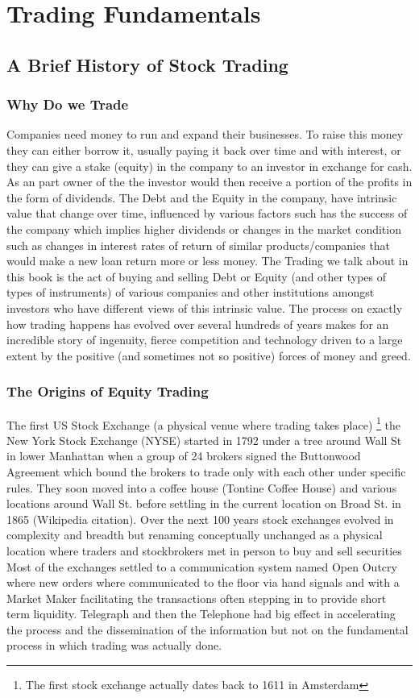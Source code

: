 
\chapter{Trading Fundamentals}

\section{A Brief History of Stock Trading}
\subsection{Why Do we Trade}
Companies need money to run and expand their businesses. To raise this money they can either borrow it, usually paying it back over time and with interest, or they can give a stake (equity) in the company to an investor in exchange for cash. As an part owner of the  the investor would then receive a portion of the profits in the form of dividends. The Debt and the Equity in the company,  have intrinsic value that change over time, influenced by various factors such has the success of the company which implies higher dividends or changes in the market condition such as changes in interest rates of return of similar products/companies that would make a new loan return more or less money. The Trading we talk about in this book is the act of buying and selling  Debt or Equity (and other types of types of instruments) of various companies and other institutions amongst investors who have different views of this intrinsic value. The process on exactly how trading happens has evolved over several hundreds of years makes for an incredible story of ingenuity, fierce competition and technology driven to a large extent by the positive (and sometimes not so positive) forces of money and greed.

\subsection{The Origins of Equity Trading}
The first US Stock Exchange (a physical venue where trading takes place) \footnote{The first stock exchange actually dates back to 1611 in Amsterdam} the New York Stock Exchange (NYSE) started in 1792 under a tree around Wall St in lower Manhattan when a group of 24 brokers signed the Buttonwood Agreement which bound the brokers to trade only with each other under specific rules. They soon moved into a coffee house (Tontine Coffee House) and various locations around Wall St. before settling in the current location on Broad St. in 1865 (Wikipedia citation). Over the next 100 years stock exchanges evolved in complexity and breadth but renaming conceptually unchanged as a physical location where traders and stockbrokers met in person to buy and sell securities Most of the exchanges settled to a communication system named Open Outcry where new orders where communicated to the floor via hand signals and with a Market Maker facilitating the transactions often stepping in to provide short term liquidity. Telegraph and then the Telephone had big effect in accelerating the process and the dissemination of the information but not on the fundamental process in which trading was actually done. 

